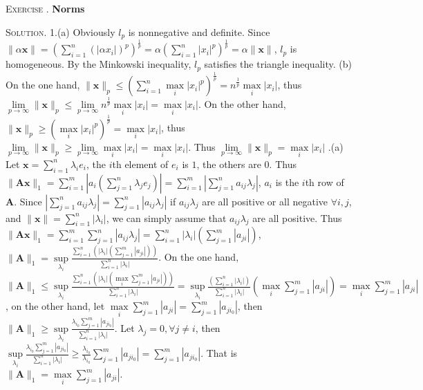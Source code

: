 \documentclass[12pt, a4paper, oneside]{ctexart}
\newcounter{problemname}
\newenvironment{exercise}{\stepcounter{problemname}\par\noindent\textsc{Exercise \arabic{problemname}. }}{\\\par}
\newenvironment{solution}{\par\noindent\textsc{Solution. }}{\\\par}
\begin{document}
\begin{exercise}
	\bf Norms
\end{exercise}

\begin{solution}
	1.(a) Obviously $l_{p}$ is nonnegative and definite. Since $\|\alpha \mathbf{x}\| = (\sum^{n}_{i=1} (|\alpha x_{i}|)^{p})^{\frac{1}{p}} = \alpha (\sum^{n}_{i=1} |x_{i}|^{p})^{\frac{1}{p}} = \alpha \|\mathbf{x}\|$, $l_{p}$ is homogeneous. By the Minkowski inequality, $l_{p}$ satisfies the triangle inequality. \newline
	(b) On the one hand, $\|\mathbf{x}\|_{p} \leq (\sum^{n}_{i=1} \max\limits_{i} |x_{i}|^{p})^{\frac{1}{p}} = n^{\frac{1}{p}}\max\limits_{i}|x_i|$, thus $\lim\limits_{p\to\infty} \|\mathbf{x}\|_{p} \leq \lim\limits_{p\to\infty} n^{\frac{1}{p}}\max\limits_{i}|x_i| = \max\limits_{i}|x_i|$. On the other hand, $\|\mathbf{x}\|_{p} \geq (\max\limits_{i} |x_{i}|^{p})^{\frac{1}{p}} = \max\limits_{i}|x_i|$, thus $\lim\limits_{p\to\infty} \|\mathbf{x}\|_{p} \geq \lim\limits_{p\to\infty} \max\limits_{i}|x_i| = \max\limits_{i}|x_i|$. Thus $\lim\limits_{p\to\infty} \|\mathbf{x}\|_{p} = \max\limits_{i}|x_i|$ .(a) Let $\mathbf{x} = \sum_{i=1}^{n} \lambda_{i} e_{i}$, the $i$th element of $e_{i}$ is $1$, the others are $0$. Thus $\|\mathbf{Ax}\|_{1} = \sum_{i=1}^{m} |a_{i} (\sum_{j=1}^{n} \lambda_{j} e_{j})| = \sum_{i=1}^{m} |\sum_{j=1}^{n} a_{ij} \lambda_{j}| $, $a_i$ is the $i$th row of $\mathbf{A}$. Since $|\sum_{j=1}^{n} a_{ij} \lambda_{j}| = \sum_{j=1}^{n} |a_{ij} \lambda_{j}|$ if $a_{ij} \lambda_{j}$ are all positive or all negative $\forall i,j$, and $\|\mathbf{x}\| = \sum_{i=1}^{n}|\lambda_{i}|$, we can simply assume that $a_{ij} \lambda_{j}$ are all positive. Thus $\|\mathbf{Ax}\|_{1} = \sum_{i=1}^{m} \sum_{j=1}^{n} |a_{ij} \lambda_{j}| = \sum_{i=1}^{n} |\lambda_{i}| (\sum_{j=1}^{m}|a_{ji}|)$, $\|\mathbf{A}\|_{1} = \sup\limits_{\lambda_{i}} \frac{ \sum_{i=1}^{n} (|\lambda_{i}| (\sum_{j=1}^{m}|a_{ji}|))}{\sum_{i=1}^{n}|\lambda_{i}|}$. On the one hand, $\|\mathbf{A}\|_{1} \leq \sup\limits_{\lambda_{i}} \frac{ \sum_{i=1}^{n} (|\lambda_{i}| (\max\limits_{i}\sum_{j=1}^{m}|a_{ji}|))}{\sum_{i=1}^{n}|\lambda_{i}|} = \sup\limits_{\lambda_{i}} \frac{(\sum_{i=1}^{n} |\lambda_{i}|)}{\sum_{i=1}^{n}|\lambda_{i}|}(\max\limits_{i}\sum_{j=1}^{m}|a_{ji}|) = \max\limits_{i}\sum_{j=1}^{m}|a_{ji}|$, on the other hand, let \newline $\max\limits_{i}\sum_{j=1}^{m}|a_{ji}| = \sum_{j=1}^{m}|a_{ji_{0}}|$, then $\|\mathbf{A}\|_{1} \geq \sup\limits_{\lambda_{i}} \frac{\lambda_{i_{0}}\sum_{j=1}^{m}|a_{ji_{0}}|}{\sum_{i=1}^{n}|\lambda_{i}|}$. Let $\lambda_{j} = 0, \forall j \neq i$, then $\sup\limits_{\lambda_{i}} \frac{\lambda_{i_{0}}\sum_{j=1}^{m}|a_{ji_{0}}|}{\sum_{i=1}^{n}|\lambda_{i}|} \geq \frac{\lambda_{i_{0}}}{\lambda_{i_{0}}}\sum_{j=1}^{m}|a_{ji_{0}}| = \sum_{j=1}^{m}|a_{ji_{0}}|$. That is $\|\mathbf{A}\|_{1} = \max\limits_{i}\sum_{j=1}^{m}|a_{ji}|$. \newline

\end{solution}
\end{document}
